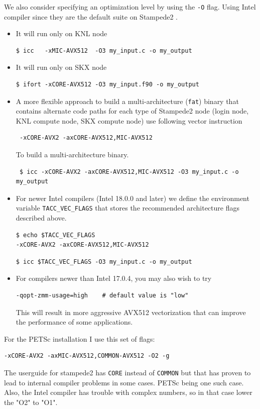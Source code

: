 \documentclass{article}
\begin{document}
We also consider specifying an optimization level by using the \verb+-O+ flag. Using Intel compiler since they are the default suite on Stampede2 \cite{TACC_Stampede2}. 
\begin{itemize}
\item It will run only on KNL node
\scriptsize
\begin{verbatim}
$ icc   -xMIC-AVX512  -O3 my_input.c -o my_output       
\end{verbatim}
\normalsize
\item It will run only on SKX node
\scriptsize
\begin{verbatim}
$ ifort -xCORE-AVX512 -O3 my_input.f90 -o my_output   
\end{verbatim}
\normalsize
\item A more flexible approach to build a multi-architecture (\verb+fat+) binary that contains alternate code paths for each type of Stampede2 node
(login node, KNL compute node, SKX compute node) use following vector instruction
\scriptsize
\begin{verbatim}
 -xCORE-AVX2 -axCORE-AVX512,MIC-AVX512
\end{verbatim}
\normalsize
To build a multi-architecture binary.
\scriptsize
\begin{verbatim}
 $ icc -xCORE-AVX2 -axCORE-AVX512,MIC-AVX512 -O3 my_input.c -o my_output
\end{verbatim}
\normalsize
\item For newer Intel compilers (Intel 18.0.0 and later) we define the environment variable \verb+TACC_VEC_FLAGS+ that stores the recommended architecture flags described above.
\scriptsize
\begin{verbatim}
$ echo $TACC_VEC_FLAGS              
-xCORE-AVX2 -axCORE-AVX512,MIC-AVX512
\end{verbatim}
\normalsize
\scriptsize
\begin{verbatim}
$ icc $TACC_VEC_FLAGS -O3 my_input.c -o my_output 
\end{verbatim}
\normalsize
\item For compilers newer than Intel 17.0.4, you may also wish to try
\scriptsize
\begin{verbatim}
-qopt-zmm-usage=high    # default value is "low"
\end{verbatim}
\normalsize
This will result in more aggressive AVX512 vectorization that can improve the performance of some applications. 
\end{itemize}

For the PETSc installation I use this set of flags:
\scriptsize
\begin{verbatim} 
-xCORE-AVX2 -axMIC-AVX512,COMMON-AVX512 -O2 -g
\end{verbatim}
\normalsize
The userguide for stampede2 has \verb+CORE+ instead of \verb+COMMON+ but that has proven to lead to internal compiler problems in some cases. 
PETSc being one such case. Also, the Intel compiler has trouble with complex numbers, so in that case lower the "O2" to "O1".
\end{document}
